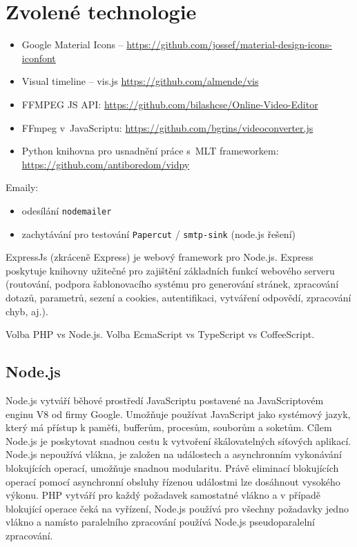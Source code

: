 \section{Zvolené technologie}
\begin{itemize}
\item Google Material Icons -- \url{https://github.com/jossef/material-design-icons-iconfont}
\item Visual timeline -- vis.js \url{https://github.com/almende/vis}
\item FFMPEG JS API: \url{https://github.com/bilashcse/Online-Video-Editor}
\item FFmpeg v~JavaScriptu: \url{https://github.com/bgrins/videoconverter.js}
\item Python knihovna pro usnadnění práce s~MLT frameworkem: \url{https://github.com/antiboredom/vidpy}
\end{itemize}
Emaily:
\begin{itemize}
\item odesílání \texttt{nodemailer}
\item zachytávání pro testování \texttt{Papercut} / \texttt{smtp-sink} (node.js řešení)
\end{itemize}

ExpressJs (zkráceně Express) je webový framework pro Node.js. Express poskytuje knihovny užitečné pro zajištění základních funkcí webového serveru (routování, podpora šablonovacího systému pro generování stránek, zpracování dotazů, parametrů, sezení a cookies, autentifikaci, vytváření odpovědí, zpracování chyb, aj.).

Volba PHP vs Node.js. Volba EcmaScript vs TypeScript vs CoffeeScript.

\subsection{Node.js}
Node.js vytváří běhové prostředí JavaScriptu postavené na JavaScriptovém enginu V8 od firmy Google. Umožňuje používat JavaScript jako systémový jazyk, který má přístup k paměťi, bufferům, procesům, souborům a soketům. Cílem Node.js je poskytovat snadnou cestu k vytvoření škálovatelných síťových aplikací. Node.js nepoužívá vlákna, je založen na událostech a asynchronním vykonávání blokujících operací, umožňuje snadnou modularitu. Právě eliminací blokujících operací pomocí asynchronní obsluhy řízenou událostmi lze dosáhnout vysokého výkonu. PHP vytváří pro každý požadavek samostatné vlákno a v případě blokující operace čeká na vyřízení, Node.js používá pro všechny požadavky jedno vlákno a namísto paralelního zpracování používá Node.js pseudoparalelní zpracování.

